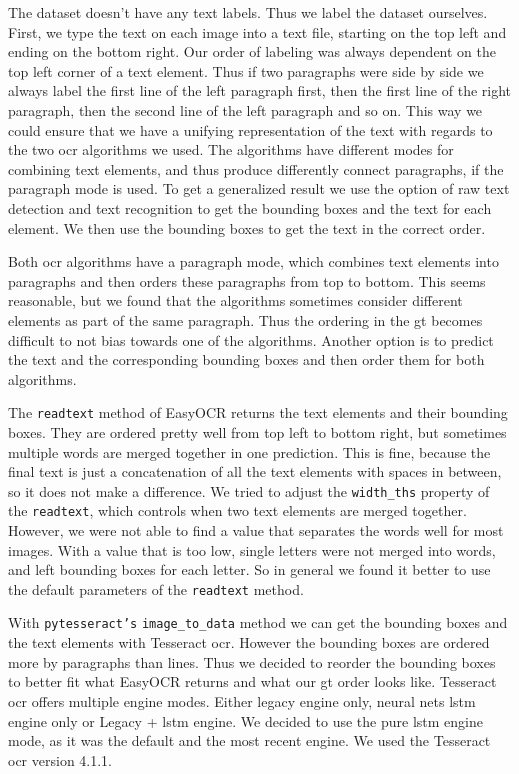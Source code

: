 The dataset doesn't have any text labels.
Thus we label the dataset ourselves.
First, we type the text on each image into a text file, starting on the top left and ending on the bottom right.
Our order of labeling was always dependent on the top left corner of a text element.
Thus if two paragraphs were side by side we always label the first line of the left paragraph first, then the first line of the right paragraph, then the second line of the left paragraph and so on.
This way we could ensure that we have a unifying representation of the text with regards to the two \gls{ocr} algorithms we used.
The algorithms have different modes for combining text elements, and thus produce differently connect paragraphs, if the paragraph mode is used.
To get a generalized result we use the option of raw text detection and text recognition to get the bounding boxes and the text for each element.
We then use the bounding boxes to get the text in the correct order.

Both \gls{ocr} algorithms have a paragraph mode, which combines text elements into paragraphs and then orders these paragraphs from top to bottom.
This seems reasonable, but we found that the algorithms sometimes consider different elements as part of the same paragraph.
Thus the ordering in the \gls{gt} becomes difficult to not bias towards one of the algorithms.
Another option is to predict the text and the corresponding bounding boxes and then order them for both algorithms.

The \texttt{readtext} method of EasyOCR returns the text elements and their bounding boxes.
They are ordered pretty well from top left to bottom right, but sometimes multiple words are merged together in one prediction.
This is fine, because the final text is just a concatenation of all the text elements with spaces in between, so it does not make a difference.
We tried to adjust the \texttt{width\_ths} property of the \texttt{readtext}, which controls when two text elements are merged together.
However, we were not able to find a value that separates the words well for most images.
With a value that is too low, single letters were not merged into words, and left bounding boxes for each letter.
So in general we found it better to use the default parameters of the \texttt{readtext} method.

With \texttt{pytesseract's} \texttt{image\_to\_data} method we can get the bounding boxes and the text elements with Tesseract \gls{ocr}.
However the bounding boxes are ordered more by paragraphs than lines.
Thus we decided to reorder the bounding boxes to better fit what EasyOCR returns and what our \gls{gt} order looks like.
Tesseract \gls{ocr} offers multiple engine modes.
Either legacy engine only, neural nets \gls{lstm} engine only or Legacy + \gls{lstm} engine.
We decided to use the pure \gls{lstm} engine mode, as it was the default and the most recent engine.
We used the Tesseract \gls{ocr} version 4.1.1.


